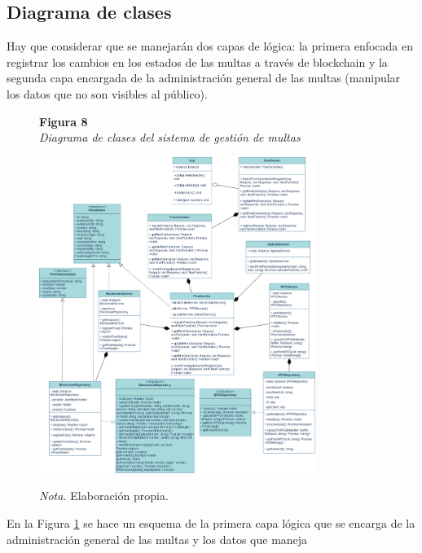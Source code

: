  \subsection{ Diagrama de clases }
Hay que considerar que se manejarán dos capas de lógica: la primera enfocada en registrar los cambios en los estados de las multas a través de blockchain y la segunda capa encargada de la administración general de las multas (manipular los datos que no son visibles al público). 
 \begin{figure}[htbp]
    \begin{flushleft}
        \textbf{Figura 8}\\[2em]
        \textit{Diagrama de clases del sistema de gestión de multas}
    \end{flushleft}
    \vspace{1em}
    \centering
    \includegraphics[width=0.8\textwidth]{Images/uml.png}
    \vspace{2em}
    \begin{flushleft}
        \textit{Nota.} Elaboración propia.
    \end{flushleft}
    \label{fig:diagrama_clases}
\end{figure}
En la Figura \ref{fig:diagrama_clases} se hace un esquema de la primera capa lógica que se encarga de la administración general de las multas y los datos que maneja
